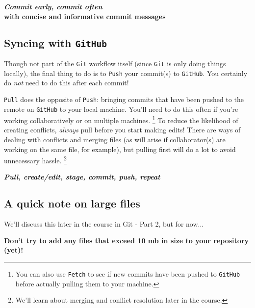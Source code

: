 \documentclass[12pt,letterpaper]{article}
\begin{document}
\begin{tcolorbox}[breakable, enhanced, before upper={\parindent15pt}]
\begin{center}
\textbf{\emph{Commit early, commit often}\\
		with concise and informative commit messages}
\end{center}
\end{tcolorbox}


\subsection{Syncing with \texttt{GitHub}}

Though not part of the \texttt{Git} workflow itself
(since \texttt{Git} is only doing things locally),
the final thing to do is to \texttt{Push} 
your commit(s) to \texttt{GitHub}.
You certainly do \textit{not} need to do this after each commit!

\texttt{Pull} does the opposite of \texttt{Push}: 
bringing commits that have been pushed to the remote on \texttt{GitHub}
to your local machine.
You'll need to do this often if you're working collaboratively or on multiple 
machines.
\unskip
\footnote{You can also use \texttt{Fetch} to see if new commits have been pushed to \texttt{GitHub} before actually pulling them to your machine.}
To reduce the likelihood of creating conflicts,
\emph{always} pull before you start making edits!
There are ways of dealing with conflicts and merging files
(as will arise if collaborator(s) are working on the same file, for example), 
but pulling first will do a lot to avoid unnecessary hassle.
\unskip
\footnote{We'll learn about merging and conflict resolution later in the course.}

\begin{tcolorbox}[breakable, enhanced, before upper={\parindent15pt}]
		\begin{center}
			\textbf{\emph{Pull, create/edit, stage, commit, push, repeat}}
		\end{center}
\end{tcolorbox}

\subsection{A quick note on large files}
We'll discuss this later in the course in Git - Part 2, but for now...

\begin{tcolorbox}[breakable, enhanced, before upper={\parindent15pt}]
	\begin{center}
		\textbf{Don't try to add any files that exceed 10 mb in size to your 
		repository (yet)!}
	\end{center}
\end{tcolorbox}
\end{document}
